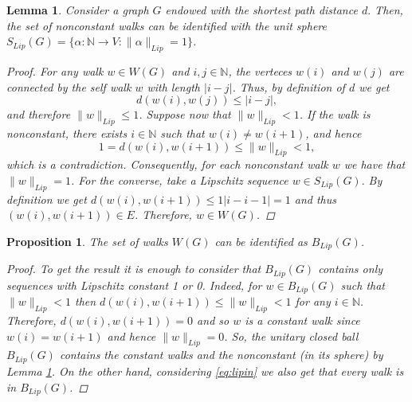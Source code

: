\documentclass[preprint,12pt]{elsarticle}
\newtheorem{lemma}[theorem]{Lemma}
\newtheorem{proposition}[theorem]{Proposition}
\begin{document}
\begin{lemma}\label{le1}
Consider a graph $G$ endowed with the shortest path distance $d.$ Then, the set of nonconstant walks can be identified with the unit sphere $S_{Lip}(G)=\{\alpha\colon\mathbb N\to V:\|\alpha\|_{Lip}=1\}$.

\begin{proof}
For any walk $w\in W(G)$ and $i,j\in\mathbb N$, the verteces $w(i)$ and $w(j)$ are connected by the self walk $w$ with length $|i-j|$. Thus, by definition of $d$ we get
\begin{equation}\label{eq:lipin}
    d(w(i),w(j))\le |i-j|,
\end{equation}
and therefore $\|w\|_{Lip}\le 1$. Suppose now that $\|w\|_{Lip}< 1$. If the walk is nonconstant, there exists $i\in\mathbb N$ such that $w(i)\neq w(i+1)$, and hence $$1=d(w(i),w(i+1))\leq \|w\|_{Lip} <1,$$
which is a contradiction. Consequently, for each nonconstant walk $w$ we have that $\|w\|_{Lip}=1$. For the converse, take a Lipschitz sequence $w\in S_{Lip}(G).$ By definition we get $d(w(i),w(i+1))\leq 1 |i-i-1|=1$ and thus $(w(i),w(i+1))\in E$. Therefore, $w\in W(G)$.
\end{proof}
\end{lemma}

\begin{proposition}\label{prop:walklip}
    The set of walks $W(G)$ can be identified as $B_{Lip}(G)$.
    \begin{proof}
        To get the result it is enough to consider that $B_{Lip}(G)$ contains only sequences with Lipschitz constant 1 or 0. Indeed, for $w\in B_{Lip}(G)$ such that $\|w\|_{Lip}<1$ then $d(w(i),w(i+1))\leq \|w\|_{Lip}<1$ for any $i\in\mathbb N$. Therefore, $d(w(i),w(i+1))=0$ and so $w$ is a constant walk since $w(i)=w(i+1)$ and hence $\|w\|_{Lip}=0$. So, the unitary closed ball $B_{Lip}(G)$ contains the constant walks and the nonconstant (in its sphere) by Lemma \ref{le1}. On the other hand, considering \eqref{eq:lipin} we also get that every walk is in $B_{Lip}(G)$.
    \end{proof}
\end{proposition}
\end{document}
